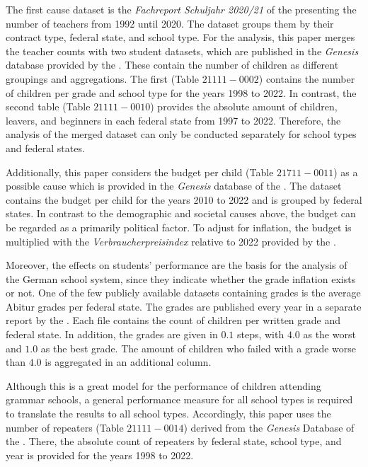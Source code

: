 The first cause dataset is the \textit{Fachreport Schuljahr 2020/21} of the \citeauthor{statistische_bundesamt_allgemeinbildende_2022} presenting the number of teachers from 1992 until 2020. The dataset groups them by their contract type, federal state, and school type. For the analysis, this paper merges the teacher counts with two student datasets, which are published in the \textit{Genesis} database provided by the \citeauthor{statistische_bundesamt_statistisches_2024}. These contain the number of children as different groupings and aggregations. The first (Table $21111-0002$) contains the number of children per grade and school type  for the years 1998 to 2022. In contrast, the second table (Table $21111-0010$) provides the absolute amount of children, leavers, and beginners in each federal state from 1997 to 2022. Therefore, the analysis of the merged dataset can only be conducted separately for school types and federal states.

Additionally, this paper considers the budget per child (Table $21711-0011$) as a possible cause which is provided in the \textit{Genesis} database of the \citeauthor{statistische_bundesamt_statistisches_2024}. The dataset contains the budget per child for the years 2010 to 2022 and is grouped by federal states. In contrast to the demographic and societal causes above, the budget can be regarded as a primarily political factor. To adjust for inflation, the budget is multiplied with the \textit{Verbraucherpreisindex} relative to 2022 provided by the \citeauthor{statistische_bundesamt_statistisches_2024}. 


Moreover, the effects on students' performance are the basis for the analysis of the German school system, since they indicate whether the grade inflation exists or not. One of the few publicly available datasets containing grades is the average Abitur grades per federal state. The grades are published every year in a separate report by the \citeauthor{kultusminister_konferenz_abiturnoten_nodate}. Each file contains the count of children per written grade and federal state. In addition, the grades are given in $0.1$ steps, with $4.0$ as the worst and $1.0$ as the best grade. The amount of children who failed with a grade worse than $4.0$ is aggregated in an additional column. 

Although this is a great model for the performance of children attending grammar schools, a general performance measure for all school types is required to translate the results to all school types. Accordingly, this paper uses the number of repeaters (Table $21111-0014$) derived from the \textit{Genesis} Database of the \citeauthor{statistische_bundesamt_statistisches_2024}. There, the absolute count of repeaters by federal state, school type, and year is provided for the years 1998 to 2022.

